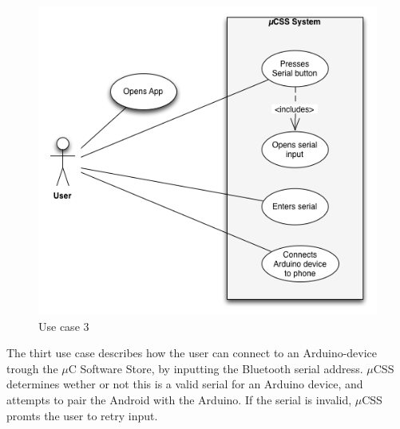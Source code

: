 \begin{figure}[H]
\centering
\includegraphics[scale=0.7]{images/UseCase3}
\caption{Use case 3}
\end{figure}

The thirt use case describes how the user can connect to an Arduino-device trough the $\mu$C Software Store, by inputting the Bluetooth serial address. $\mu$CSS determines wether or not this is a valid serial for an Arduino device, and attempts to pair the Android with the Arduino. If the serial is invalid, $\mu$CSS promts the user to retry input.

